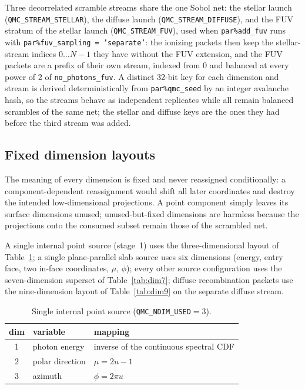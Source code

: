 \documentclass[english,a4paper]{my_memo}
\newcommand{\code}[1]{\texttt{#1}}
\begin{document}
Three decorrelated scramble streams share the one Sobol net: the stellar launch
(\code{QMC\_STREAM\_STELLAR}), the diffuse launch
(\code{QMC\_STREAM\_DIFFUSE}), and the FUV stratum of the stellar launch
(\code{QMC\_STREAM\_FUV}), used when \code{par\%add\_fuv} runs with
\code{par\%fuv\_sampling = 'separate'}: the ionizing packets then keep the
stellar-stream indices $0\ldots N-1$ they have without the FUV extension, and
the FUV packets are a prefix of their own stream, indexed from 0 and balanced
at every power of 2 of \code{no\_photons\_fuv}.  A distinct 32-bit key for
each dimension and stream is derived deterministically from
\code{par\%qmc\_seed} by an integer avalanche hash, so the streams behave as
independent replicates while all remain balanced scrambles of the same net; the
stellar and diffuse keys are the ones they had before the third stream was
added.

\subsection{Fixed dimension layouts}
The meaning of every dimension is fixed and never reassigned conditionally: a
component-dependent reassignment would shift all later coordinates and destroy
the intended low-dimensional projections.  A point component simply leaves its
surface dimensions unused; unused-but-fixed dimensions are harmless because the
projections onto the consumed subset remain those of the scrambled net.

A single internal point source (stage~1) uses the three-dimensional layout of
Table~\ref{tab:dim1}; a single plane-parallel slab source uses six dimensions
(energy, entry face, two in-face coordinates, $\mu$, $\phi$); every other
source configuration uses the seven-dimension superset of Table~\ref{tab:dim7}; diffuse recombination packets use the
nine-dimension layout of Table~\ref{tab:dim9} on the separate diffuse stream.

\begin{table}[htbp]
\centering
\small
\caption{Single internal point source (\code{QMC\_NDIM\_USED}${}=3$).}
\label{tab:dim1}
\begin{tabular}{cll}
\toprule
dim & variable & mapping \\
\midrule
1 & photon energy & inverse of the continuous spectral CDF \\
2 & polar direction & $\mu = 2u-1$ \\
3 & azimuth & $\phi = 2\pi u$ \\
\bottomrule
\end{tabular}
\end{table}
\end{document}
